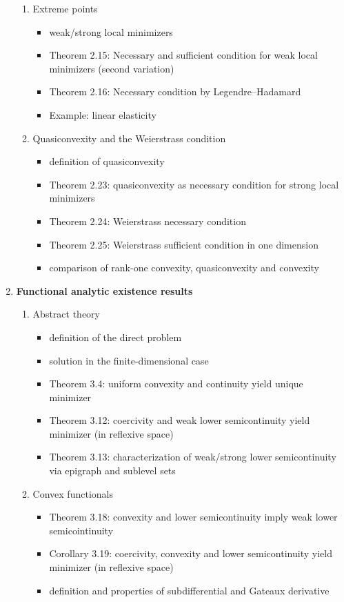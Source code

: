 \documentclass[12pt,a4paper]{article}
\begin{document}
\begin{enumerate}
\begin{enumerate}
        \item Extreme points
        \begin{itemize}
            \item weak/strong local minimizers
            \item Theorem 2.15: Necessary and sufficient condition for weak local minimizers (second variation)
            \item Theorem 2.16: Necessary condition by Legendre--Hadamard
            \item Example: linear elasticity
        \end{itemize}
        
        \item Quasiconvexity and the Weierstrass condition
        \begin{itemize}
            \item definition of quasiconvexity
            \item Theorem 2.23: quasiconvexity as necessary condition for strong local minimizers
            \item Theorem 2.24: Weierstrass necessary condition
            \item Theorem 2.25: Weierstrass sufficient condition in one dimension
            \item comparison of rank-one convexity, quasiconvexity and convexity
        \end{itemize}
    \end{enumerate}
    \newpage
    \item \textbf{Functional analytic existence results}
    \begin{enumerate}
        \item Abstract theory
        \begin{itemize}
            \item definition of the direct problem
            \item solution in the finite-dimensional case
            \item Theorem 3.4: uniform convexity and continuity yield  unique minimizer
            \item Theorem 3.12: coercivity and weak lower semicontinuity yield minimizer (in reflexive space)
            \item Theorem 3.13: characterization of weak/strong lower semicontinuity via epigraph and sublevel sets
        \end{itemize}
        
        \item Convex functionals
        \begin{itemize}
            \item Theorem 3.18: convexity and lower semicontinuity imply weak lower semicointinuity
            \item Corollary 3.19: coercivity, convexity and lower semicontinuity yield minimizer (in reflexive space)
            \item definition and properties of subdifferential and Gateaux derivative
        \end{itemize}
        

\end{enumerate}
\end{enumerate}
\end{document}
